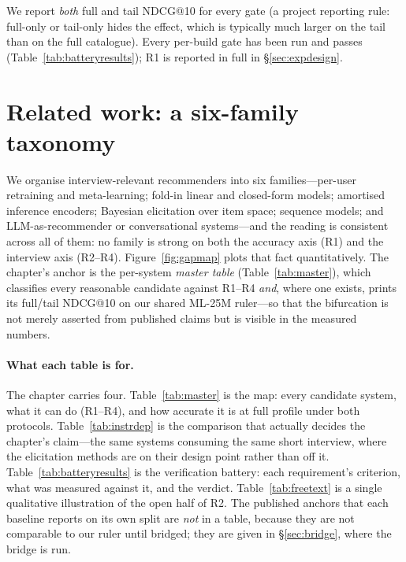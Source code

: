 \documentclass[11pt]{article}
\begin{document}
We report \emph{both} full and tail NDCG@10 for every gate (a project reporting rule: full-only or tail-only hides the
effect, which is typically much larger on the tail than on the full catalogue). Every per-build gate has been run and passes
(Table~\ref{tab:batteryresults}); R1 is reported in full in \S\ref{sec:expdesign}.

\section{Related work: a six-family taxonomy}\label{sec:related}

We organise interview-relevant recommenders into six families---per-user retraining and meta-learning;
fold-in linear and closed-form models; amortised inference encoders; Bayesian elicitation over item space;
sequence models; and LLM-as-recommender or conversational systems---and the reading is consistent across
all of them: no family is strong on both the accuracy axis (R1) and the interview axis (R2--R4).
Figure~\ref{fig:gapmap} plots that fact quantitatively. The chapter's anchor is the per-system
\emph{master table} (Table~\ref{tab:master}), which classifies every reasonable candidate against R1--R4
\emph{and}, where one exists, prints its full/tail NDCG@10 on our shared ML-25M ruler---so that the bifurcation
is not merely asserted from published claims but is visible in the measured numbers.

\paragraph{What each table is for.} The chapter carries four. Table~\ref{tab:master} is the map: every
candidate system, what it can do (R1--R4), and how accurate it is at full profile under both protocols.
Table~\ref{tab:instrdep} is the comparison that actually decides the chapter's claim---the same systems
consuming the same short interview, where the elicitation methods are on their design point rather than off
it. Table~\ref{tab:batteryresults} is the verification battery: each requirement's criterion, what was
measured against it, and the verdict. Table~\ref{tab:freetext} is a single qualitative illustration of the
open half of R2. The published anchors that each baseline reports on its own split are \emph{not} in a
table, because they are not comparable to our ruler until bridged; they are given in \S\ref{sec:bridge},
where the bridge is run.
\end{document}
